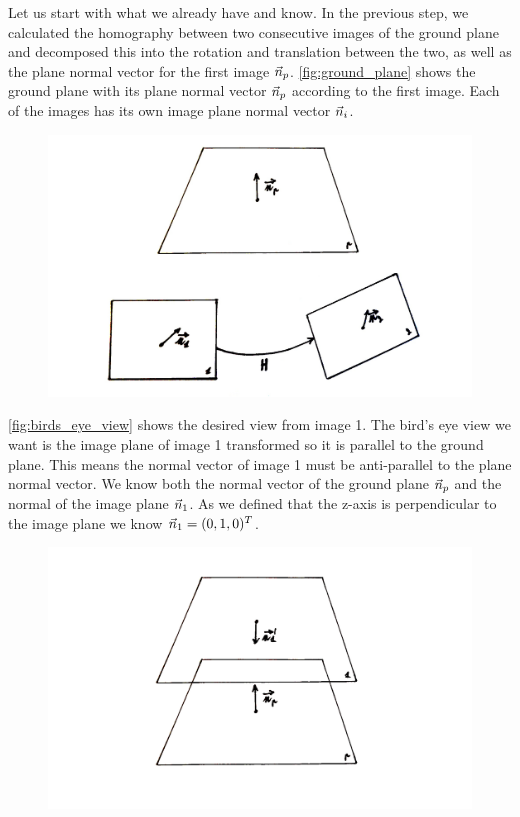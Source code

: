 Let us start with what we already have and know. In the previous step, we calculated the homography between two consecutive images of the ground plane and decomposed this into the rotation and translation between the two, as well as the plane normal vector for the first image $\vec n_p$. \autoref{fig:ground_plane} shows the ground plane with its plane normal vector $\vec n_p$ according to the first image. Each of the images has its own image plane normal vector $\vec n_i$.\bigskip

\begin{figure}
    \centering
    \includegraphics[width=\textwidth]{figures/birds_eye_view.jpg}
    \caption{}
    \label{fig:ground_plane}
\end{figure}

\autoref{fig:birds_eye_view} shows the desired view from image 1. The bird's eye view we want is the image plane of image 1 transformed so it is parallel to the ground plane. This means the normal vector of image 1 must be anti-parallel to the plane normal vector. We know both the normal vector of the ground plane $\vec n_p$ and the normal of the image plane $\vec n_1$. As we defined that the z-axis is perpendicular to the image plane we know $\vec n_1 = (0, 1, 0)^T$.\bigskip

\begin{figure}
    \centering
    \includegraphics[width=\textwidth]{figures/birds_eye_view_2.jpg}
    \caption{}
    \label{fig:birds_eye_view}
\end{figure}

